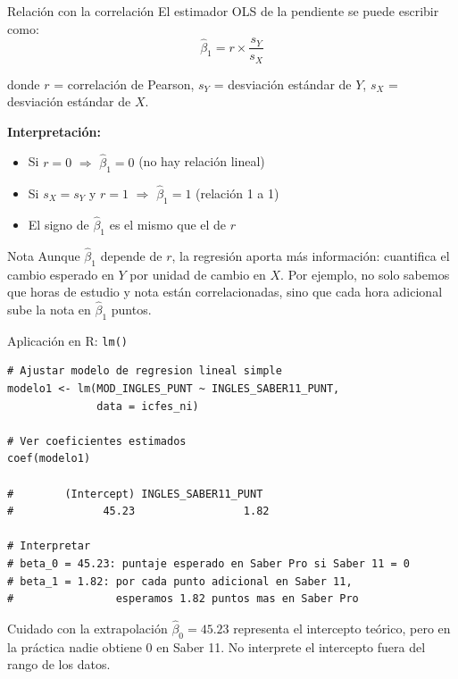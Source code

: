\documentclass[aspectratio=169, 11pt]{beamer}
\begin{document}
\begin{frame}{Relaci\'on con la correlaci\'on}
El estimador OLS de la pendiente se puede escribir como:
\[
\hat{\beta}_1 = r \times \frac{s_Y}{s_X}
\]
\begin{small}
donde $r$ = correlaci\'on de Pearson, $s_Y$ = desviaci\'on est\'andar de $Y$, $s_X$ = desviaci\'on est\'andar de $X$.
\end{small}

\vspace{0.2cm}
\textbf{Interpretaci\'on:}
\begin{itemize}
  \item Si $r = 0$ $\Rightarrow$ $\hat{\beta}_1 = 0$ (no hay relaci\'on lineal)
  \item Si $s_X = s_Y$ y $r = 1$ $\Rightarrow$ $\hat{\beta}_1 = 1$ (relaci\'on 1 a 1)
  \item El signo de $\hat{\beta}_1$ es el mismo que el de $r$
\end{itemize}

\vspace{0.1cm}
\begin{exampleblock}{Nota}
\small Aunque $\hat{\beta}_1$ depende de $r$, la regresi\'on aporta m\'as informaci\'on: cuantifica el cambio esperado en $Y$ por unidad de cambio en $X$. Por ejemplo, no solo sabemos que horas de estudio y nota est\'an correlacionadas, sino que cada hora adicional sube la nota en $\hat{\beta}_1$ puntos.
\end{exampleblock}
\end{frame}

\begin{frame}[fragile]{Aplicaci\'on en R: \texttt{lm()}}
\begin{lstlisting}[basicstyle=\ttfamily\scriptsize]
# Ajustar modelo de regresion lineal simple
modelo1 <- lm(MOD_INGLES_PUNT ~ INGLES_SABER11_PUNT,
              data = icfes_ni)

# Ver coeficientes estimados
coef(modelo1)

#        (Intercept) INGLES_SABER11_PUNT
#              45.23                 1.82

# Interpretar
# beta_0 = 45.23: puntaje esperado en Saber Pro si Saber 11 = 0
# beta_1 = 1.82: por cada punto adicional en Saber 11,
#                esperamos 1.82 puntos mas en Saber Pro
\end{lstlisting}

\vspace{0.2cm}
\begin{alertblock}{Cuidado con la extrapolación}
$\hat{\beta}_0 = 45.23$ representa el intercepto teórico, pero en la práctica nadie obtiene 0 en Saber 11. No interprete el intercepto fuera del rango de los datos.
\end{alertblock}
\end{frame}
\end{document}
